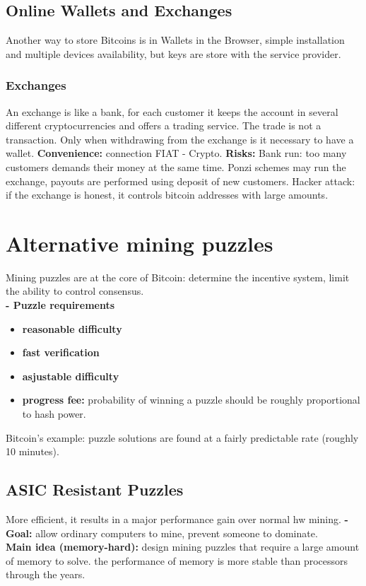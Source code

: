 \documentclass{article}
\begin{document}
\subsection{Online Wallets and Exchanges}
Another way to store Bitcoins is in Wallets in the Browser, simple installation and multiple devices availability, but keys are store with the service provider.\\
\subsubsection{Exchanges}
An exchange is like a bank, for each customer it keeps the account in several different cryptocurrencies and offers a trading service. The trade is not a transaction. Only when withdrawing from the exchange is it necessary to have a wallet. \textbf{Convenience: }connection FIAT - Crypto. \textbf{Risks: }Bank run: too many customers demands their money at the same time. Ponzi schemes may run the exchange, payouts are performed using deposit of new customers. Hacker attack: if the exchange is honest, it controls bitcoin addresses with large amounts.


\section{Alternative mining puzzles}
Mining puzzles are at the core of Bitcoin: determine the incentive system, limit the ability to control consensus.\\
\textbf{- Puzzle requirements}
\begin{itemize}
\item \textbf{reasonable difficulty}
\item \textbf{fast verification}
\item \textbf{asjustable difficulty}
\item \textbf{progress fee: }probability of winning a puzzle should be roughly proportional to hash power.
\end{itemize}
Bitcoin's example: puzzle solutions are found at a fairly predictable rate (roughly 10 minutes).\\
\subsection{ASIC Resistant Puzzles}
More efficient, it results in a major performance gain over normal hw mining.
\textbf{- Goal:} allow ordinary computers to mine, prevent someone to dominate. \\\textbf{Main idea (memory-hard): } design mining puzzles that require a large amount of memory to solve. the performance of memory is more stable than processors through the years.\\
\end{document}
